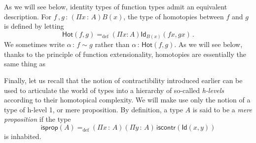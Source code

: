 \documentclass[10pt,a4paper,oneside,reqno]{amsart}
\numberwithin{equation}{section}
\theoremstyle{mythm}
\theoremstyle{mydef}
\theoremstyle{myrmk}
\newcommand{\defeq}{=_{\mathrm{def}}}
\newcommand{\co}{\,{:}\,}
\newcommand{\iscontr}{\mathsf{iscontr}}
\newcommand{\isprop}{\mathsf{isprop}}
\newcommand{\Hot}{\mathsf{Hot}}
\newcommand{\Id}{\mathsf{Id}}
\begin{document}
As we will see below, identity types of function types admit an equivalent description.  For $f \, , g \co (\Pi x \co A) B(x)$, the type of homotopies between $f$ and $g$ 
is defined by letting
\[
\Hot(f,g) \defeq (\Pi x:A) \Id_{B(x)}(fx,gx) \, .
\]
We sometimes write  $\alpha \co f \sim g$ rather than $\alpha \co \Hot(f,g)$. As we will see below, thanks to the
principle of function extensionality, homotopies are essentially the same thing as 

Finally, let us recall that the notion of contractibility introduced earlier can be used to articulate the world of types  
into a hierarchy of so-called \emph{h-levels} according to their homotopical complexity. We will make use only the notion of a type of h-level 1, or mere proposition. By definition, a type $A$ is said to be a \emph{mere proposition} if the type
\[
\isprop(A) \defeq (\Pi x \co A)(\Pi  y \co A) \, \iscontr( \Id(x,y)) 
\]
is inhabited.
\end{document}

